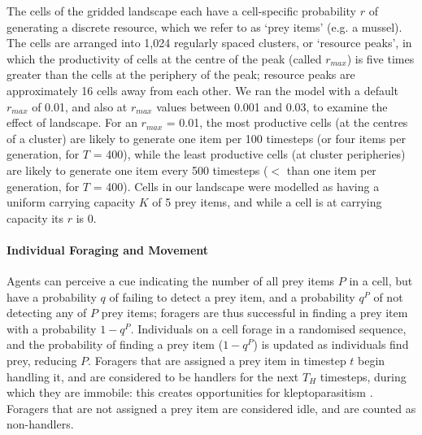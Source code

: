     The cells of the gridded landscape each have a cell-specific probability $r$ of generating a discrete resource, which we refer to as `prey items' (e.g. a mussel).
    The cells are arranged into 1,024 regularly spaced clusters, or `resource peaks', in which the productivity of cells at the centre of the peak (called $r_{max}$) is five times greater than the cells at the periphery of the peak; resource peaks are approximately 16 cells away from each other.
    We ran the model with a default $r_{max}$ of 0.01, and also at $r_{max}$ values between 0.001 and 0.03, to examine the effect of landscape.
    For an $r_{max}$ = 0.01, the most productive cells (at the centres of a cluster) are likely to generate one item per 100 timesteps (or four items per generation, for $T$ = 400), while the least productive cells (at cluster peripheries) are likely to generate one item every 500 timesteps ($<$ than one item per generation, for $T$ = 400).
    Cells in our landscape were modelled as having a uniform carrying capacity $K$ of 5 prey items, and while a cell is at carrying capacity its $r$ is 0.
    
    \paragraph*{Individual Foraging and Movement}
    
    Agents can perceive a cue indicating the number of all prey items $P$ in a cell, but have a probability $q$ of failing to detect a prey item, and a probability $q^P$ of not detecting any of $P$ prey items; foragers are thus successful in finding a prey item with a probability $1 - q^P$.
    Individuals on a cell forage in a randomised sequence, and the probability of finding a prey item ($1 - q^P$) is updated as individuals find prey, reducing $P$.
    Foragers that are assigned a prey item in timestep $t$ begin handling it, and are considered to be handlers for the next $T_H$ timesteps, during which they are immobile: this creates opportunities for kleptoparasitism \citep{holmgren1995}.
    Foragers that are not assigned a prey item are considered idle, and are counted as non-handlers.
    
